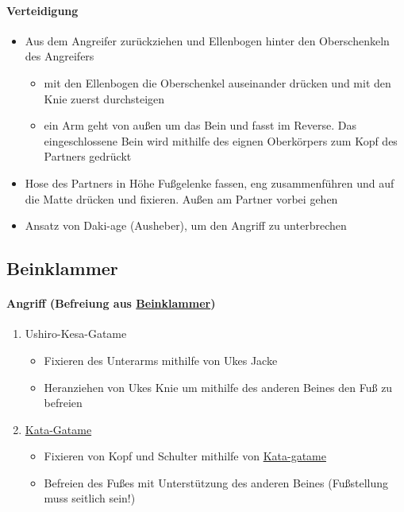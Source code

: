 \documentclass[justified, a4paper, notitlepage, captions=tableheading, nobib]{tufte-handout}
\begin{document}
\paragraph{Verteidigung}
\label{sec:orgd2ce300}
\begin{itemize}
\item Aus dem Angreifer zurückziehen und Ellenbogen hinter den Oberschenkeln des Angreifers
\begin{itemize}
\item mit den Ellenbogen die Oberschenkel auseinander drücken und mit den Knie zuerst durchsteigen
\item ein Arm geht von außen um das Bein und fasst im Reverse. Das eingeschlossene Bein wird mithilfe des eignen Oberkörpers zum Kopf des Partners gedrückt
\end{itemize}
\item Hose des Partners in Höhe Fußgelenke fassen, eng zusammenführen und auf die Matte drücken und fixieren. Außen am Partner vorbei gehen
\item Ansatz von Daki-age (Ausheber), um den Angriff zu unterbrechen
\end{itemize}


\subsection{\label{org5e254da}Beinklammer }
\label{sec:orgb4d05ed}
\paragraph{Angriff (Befreiung aus \hyperref[org5e254da]{Beinklammer})}
\label{sec:orge453da7}
\begin{enumerate}
\item Ushiro-Kesa-Gatame
\begin{itemize}
\item Fixieren des Unterarms mithilfe von Ukes Jacke
\item Heranziehen von Ukes Knie um mithilfe des anderen Beines den Fuß zu befreien
\end{itemize}
\item \hyperref[org024b4c5]{Kata-Gatame}
\begin{itemize}
\item Fixieren von Kopf und Schulter mithilfe von \hyperref[org024b4c5]{Kata-gatame}
\item Befreien des Fußes mit Unterstützung des anderen Beines (Fußstellung muss seitlich sein!)
\end{itemize}
\end{enumerate}
\end{document}
